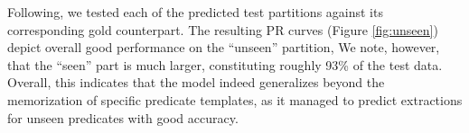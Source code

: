 Following, we tested each of the predicted test partitions against its corresponding gold
counterpart.
The resulting PR curves (Figure \ref{fig:unseen}) depict overall good performance on the ``unseen'' partition,
We note, however, that the ``seen'' part is much larger, constituting roughly 93\% of the test data.
Overall, this indicates that the model indeed generalizes beyond the memorization of specific predicate templates, as
it managed to predict extractions for unseen predicates with good accuracy.







